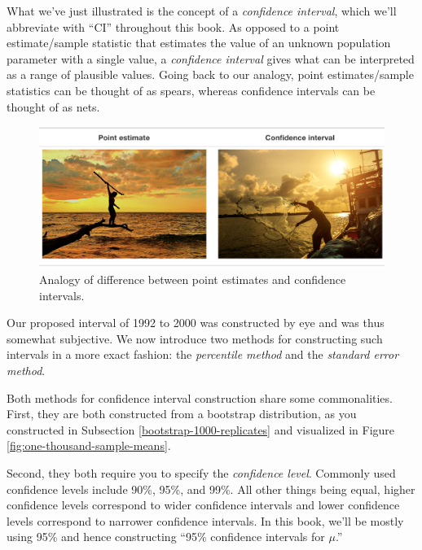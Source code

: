 \documentclass[
]{book}
\begin{document}
What we've just illustrated is the concept of a \emph{confidence interval}, which we'll abbreviate with ``CI'' throughout this book. As opposed to a point estimate/sample statistic that estimates the value of an unknown population parameter with a single value, a \emph{confidence interval}  gives what can be interpreted as a range of plausible values. Going back to our analogy, point estimates/sample statistics can be thought of as spears, whereas confidence intervals can be thought of as nets.

\begin{figure}

{\centering \includegraphics[width=1\linewidth]{images/shutterstock/point_estimate_vs_conf_int} 

}

\caption{Analogy of difference between point estimates and confidence intervals.}\label{fig:point-estimate-vs-conf-int}
\end{figure}

Our proposed interval of 1992 to 2000 was constructed by eye and was thus somewhat subjective. We now introduce two methods for constructing such intervals in a more exact fashion: the \emph{percentile method} and the \emph{standard error method}.

Both methods for confidence interval construction share some commonalities. First, they are both constructed from a bootstrap distribution, as you constructed in Subsection \ref{bootstrap-1000-replicates} and visualized in Figure \ref{fig:one-thousand-sample-means}.

Second, they both require you to specify the  \emph{confidence level}. Commonly used confidence levels include 90\%, 95\%, and 99\%. All other things being equal, higher confidence levels correspond to wider confidence intervals and lower confidence levels correspond to narrower confidence intervals. In this book, we'll be mostly using 95\% and hence constructing ``95\% confidence intervals for \(\mu\).''
\end{document}
